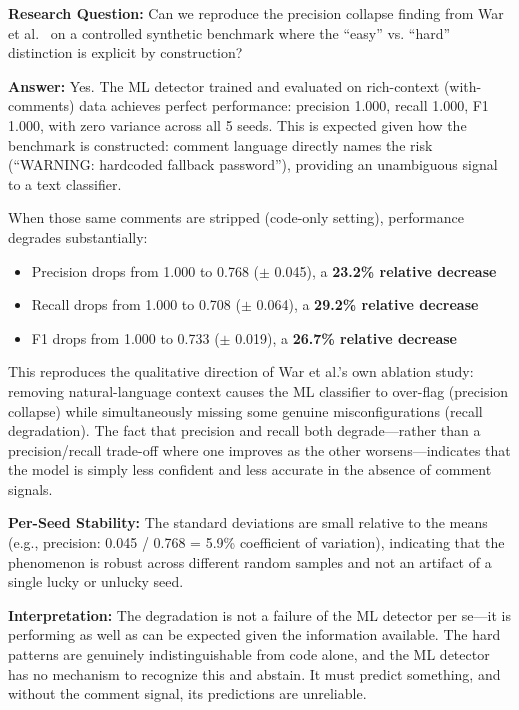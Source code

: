 \textbf{Research Question:} Can we reproduce the precision collapse finding from War et al.~\cite{War25} on a controlled synthetic benchmark where the ``easy'' vs. ``hard'' distinction is explicit by construction?

\textbf{Answer:} Yes. The ML detector trained and evaluated on rich-context (with-comments) data achieves perfect performance: precision 1.000, recall 1.000, F1 1.000, with zero variance across all 5 seeds. This is expected given how the benchmark is constructed: comment language directly names the risk (``WARNING: hardcoded fallback password''), providing an unambiguous signal to a text classifier.

When those same comments are stripped (code-only setting), performance degrades substantially:
\begin{itemize}
  \item Precision drops from 1.000 to 0.768 ($\pm$ 0.045), a \textbf{23.2\% relative decrease}
  \item Recall drops from 1.000 to 0.708 ($\pm$ 0.064), a \textbf{29.2\% relative decrease}
  \item F1 drops from 1.000 to 0.733 ($\pm$ 0.019), a \textbf{26.7\% relative decrease}
\end{itemize}

This reproduces the qualitative direction of War et al.'s own ablation study: removing natural-language context causes the ML classifier to over-flag (precision collapse) while simultaneously missing some genuine misconfigurations (recall degradation). The fact that precision and recall both degrade—rather than a precision/recall trade-off where one improves as the other worsens—indicates that the model is simply less confident and less accurate in the absence of comment signals.

\textbf{Per-Seed Stability:} The standard deviations are small relative to the means (e.g., precision: 0.045 / 0.768 = 5.9\% coefficient of variation), indicating that the phenomenon is robust across different random samples and not an artifact of a single lucky or unlucky seed.

\textbf{Interpretation:} The degradation is not a failure of the ML detector per se—it is performing as well as can be expected given the information available. The hard patterns are genuinely indistinguishable from code alone, and the ML detector has no mechanism to recognize this and abstain. It must predict something, and without the comment signal, its predictions are unreliable.

